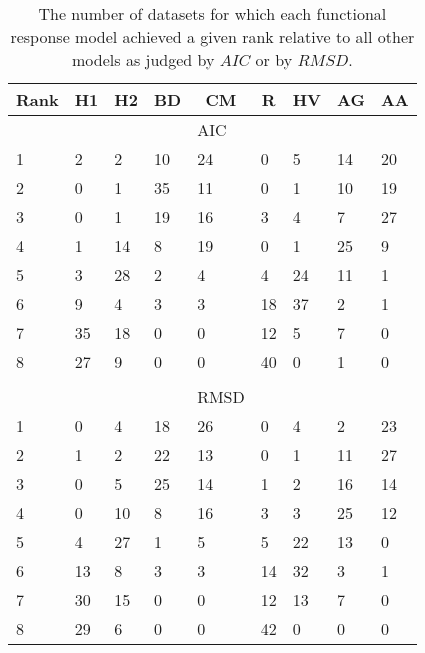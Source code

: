 \begin{table}[!tbp]
\caption{The number of datasets for which each functional response model achieved a given rank relative to all other models as judged by $AIC$ or by $RMSD$.\label{table:AIC_and_RMSD_rankings}} 
\begin{center}
\begin{tabular}{lllllllll}
\hline\hline
\multicolumn{1}{l}{Rank}&\multicolumn{1}{c}{H1}&\multicolumn{1}{c}{H2}&\multicolumn{1}{c}{BD}&\multicolumn{1}{c}{CM}&\multicolumn{1}{c}{R}&\multicolumn{1}{c}{HV}&\multicolumn{1}{c}{AG}&\multicolumn{1}{c}{AA}\tabularnewline
\hline
&&&&AIC&&&&\tabularnewline
1&2&2&10&24&0&5&14&20\tabularnewline
2&0&1&35&11&0&1&10&19\tabularnewline
3&0&1&19&16&3&4&7&27\tabularnewline
4&1&14&8&19&0&1&25&9\tabularnewline
5&3&28&2&4&4&24&11&1\tabularnewline
6&9&4&3&3&18&37&2&1\tabularnewline
7&35&18&0&0&12&5&7&0\tabularnewline
8&27&9&0&0&40&0&1&0\tabularnewline
&&&&&&&&\tabularnewline
&&&&RMSD&&&&\tabularnewline
1&0&4&18&26&0&4&2&23\tabularnewline
2&1&2&22&13&0&1&11&27\tabularnewline
3&0&5&25&14&1&2&16&14\tabularnewline
4&0&10&8&16&3&3&25&12\tabularnewline
5&4&27&1&5&5&22&13&0\tabularnewline
6&13&8&3&3&14&32&3&1\tabularnewline
7&30&15&0&0&12&13&7&0\tabularnewline
8&29&6&0&0&42&0&0&0\tabularnewline
\hline
\end{tabular}\end{center}
\end{table}

